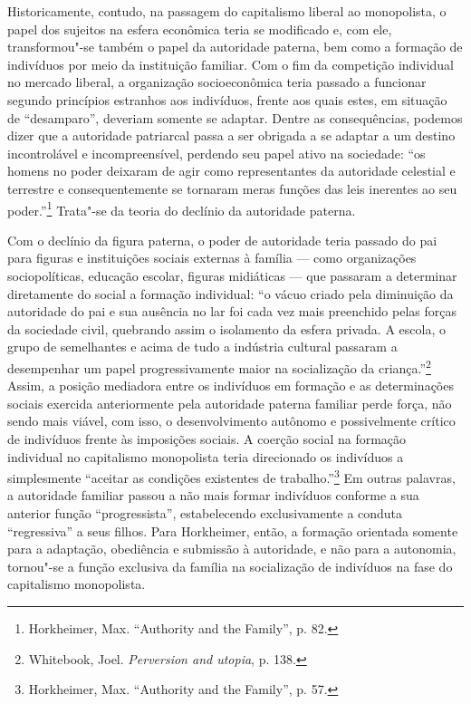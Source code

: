 Historicamente, contudo, na passagem do capitalismo liberal ao
monopolista, o papel dos sujeitos na esfera econômica teria se
modificado e, com ele, transformou"-se também o papel da autoridade
paterna, bem como a formação de indivíduos por meio da instituição
familiar. Com o fim da competição individual no mercado liberal, a
organização socioeconômica teria passado a funcionar segundo princípios
estranhos aos indivíduos, frente aos quais estes, em situação de
``desamparo'', deveriam somente se adaptar. Dentre as consequências,
podemos dizer que a autoridade patriarcal passa a ser obrigada a se
adaptar a um destino incontrolável e incompreensível, perdendo seu papel
ativo na sociedade: ``os homens no poder deixaram de agir como
representantes da autoridade celestial e terrestre e consequentemente se
tornaram meras funções das leis inerentes ao seu poder.''\footnote{Horkheimer,
  Max. ``Authority and the Family'', p. 82.} Trata"-se da teoria do
declínio da autoridade paterna.

Com o declínio da figura paterna, o poder de autoridade teria passado do
pai para figuras e instituições sociais externas à família --- como
organizações sociopolíticas, educação escolar, figuras midiáticas --- que
passaram a determinar diretamente do social a formação individual: ``o
vácuo criado pela diminuição da autoridade do pai e sua ausência no lar
foi cada vez mais preenchido pelas forças da sociedade civil, quebrando
assim o isolamento da esfera privada. A escola, o grupo de semelhantes e
acima de tudo a indústria cultural passaram a desempenhar um papel
progressivamente maior na socialização da criança.''\footnote{Whitebook,
  Joel. \emph{Perversion and utopia}, p. 138.} Assim, a posição
mediadora entre os indivíduos em formação e as determinações sociais
exercida anteriormente pela autoridade paterna familiar perde força, não
sendo mais viável, com isso, o desenvolvimento autônomo e possivelmente
crítico de indivíduos frente às imposições sociais. A coerção social na
formação individual no capitalismo monopolista teria direcionado os
indivíduos a simplesmente ``aceitar as condições existentes de
trabalho.''\footnote{Horkheimer, Max. ``Authority and the Family'', p.
  57.} Em outras palavras, a autoridade familiar passou a não mais
formar indivíduos conforme a sua anterior função ``progressista'',
estabelecendo exclusivamente a conduta ``regressiva'' a seus filhos.
Para Horkheimer, então, a formação orientada somente para a adaptação,
obediência e submissão à autoridade, e não para a autonomia, tornou"-se a
função exclusiva da família na socialização de indivíduos na fase do
capitalismo monopolista.

